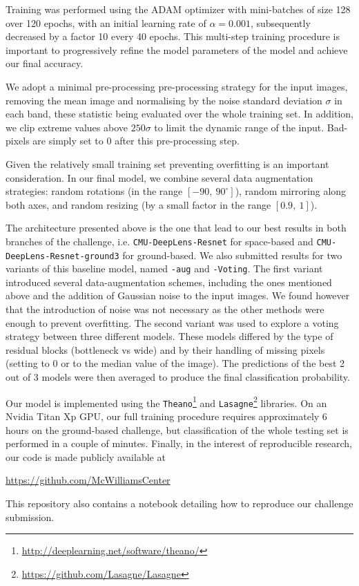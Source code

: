 \documentclass[useAMS,usenatbib]{mnras}
\begin{document}
Training was performed using the ADAM optimizer with mini-batches of size 128 over 120 epochs, with an initial learning rate of $\alpha=0.001$, subsequently decreased by a factor 10 every 40 epochs. This multi-step training procedure is important to progressively refine the model parameters of the model and achieve our final accuracy.

We adopt a minimal pre-processing pre-processing strategy for the input images, removing the mean image and normalising by the noise standard deviation $\sigma$ in each band, these statistic being evaluated over the whole training set. In addition, we clip extreme values above $250 \sigma$ to limit the dynamic range of the input. Bad-pixels are simply set to 0 after this pre-processing step.

Given the relatively small training set preventing overfitting is an important consideration. In our final model, we combine several data augmentation strategies: random rotations (in the range $[-90, \ 90^\circ]$), random mirroring along both axes, and random resizing (by a small factor in the range $[0.9, \ 1]$).

The architecture presented above is the one that lead to our best results in both branches of the challenge, i.e. \texttt{CMU-DeepLens-Resnet} for space-based and \texttt{CMU-DeepLens-Resnet-ground3} for ground-based. We also submitted results for two variants of this baseline model, named \texttt{-aug} and \texttt{-Voting}. 
The first variant introduced several data-augmentation schemes, including the ones mentioned above and the addition of Gaussian noise to the input images. We found however that the introduction of noise was not necessary as the other methods were enough to prevent overfitting. 
The second variant was used to explore a voting strategy between three different models. These models differed by the type of residual blocks (bottleneck vs wide) and by their handling of missing pixels (setting to 0 or to the median value of the image). The predictions of the best 2 out of 3 models were then averaged to produce the final classification probability.

Our model is implemented using the \texttt{Theano}\footnote{\url{http://deeplearning.net/software/theano/}} and \texttt{Lasagne}\footnote{\url{https://github.com/Lasagne/Lasagne}} libraries. On an Nvidia Titan Xp GPU, our full training procedure requires approximately 6 hours on the ground-based challenge, but classification of the whole testing set is performed in a couple of minutes. Finally, in the interest of reproducible research, our code is made publicly available at
\begin{center}
\url{https://github.com/McWilliamsCenter} 
\end{center}
This repository also contains a notebook detailing how to reproduce our challenge submission.
\end{document}
